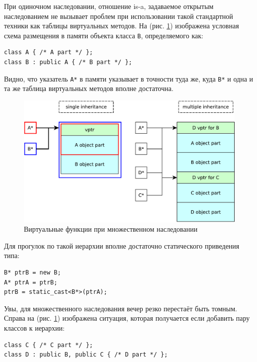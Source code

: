 \documentclass[a4paper,12pt,oneside]{article}
\begin{document}
При одиночном наследовании, отношение is-a, задаваемое открытым наследованием не вызывает проблем при использовании такой стандартной техники как таблицы виртуальных методов. На (рис. \ref{fig:multinh-crop}) изображена условная схема размещения в памяти объекта класса \lstinline!B!, определяемого как:

\begin{lstlisting}
class A { /* A part */ };
class B : public A { /* B part */ };
\end{lstlisting}

Видно, что указатель \lstinline!A*! в памяти указывает в точности туда же, куда \lstinline!B*! и одна и та же таблица виртуальных методов вполне достаточна.

\begin{figure}[h!]
\centering
\includegraphics[width=1.0\textwidth]{illustrations/multinh-crop.pdf}
\caption{Виртуальные функции при множественном наследовании}
\label{fig:multinh-crop}
\end{figure}

Для прогулок по такой иерархии вполне достаточно статического приведения типа:

\begin{lstlisting}
B* ptrB = new B;
A* ptrA = ptrB;
ptrB = static_cast<B*>(ptrA);
\end{lstlisting}

Увы, для множественного наследования вечер резко перестаёт быть томным. Справа на (рис. \ref{fig:multinh-crop}) изображена ситуация, которая получается если добавить пару классов к иерархии:

\begin{lstlisting}
class C { /* C part */ };
class D : public B, public C { /* D part */ };
\end{lstlisting}
\end{document}
